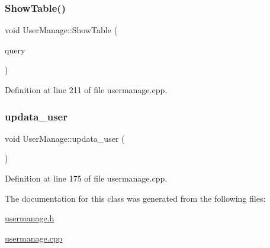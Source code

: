 \mbox{\label{class_user_manage_aa0a2437c0e95fb846c0e5a237d848af2}} 
\subsubsection{\texorpdfstring{ShowTable()}{ShowTable()}}
{\footnotesize\ttfamily void User\+Manage\+::\+Show\+Table (\begin{DoxyParamCaption}\item[{Q\+Sql\+Query}]{query }\end{DoxyParamCaption})}



Definition at line 211 of file usermanage.\+cpp.

\mbox{\label{class_user_manage_ab7f81e5e1f3d9944c551401dba37693f}} 
\subsubsection{\texorpdfstring{updata\_user}{updata\_user}}
{\footnotesize\ttfamily void User\+Manage\+::updata\+\_\+user (\begin{DoxyParamCaption}{ }\end{DoxyParamCaption})\hspace{0.3cm}{\ttfamily [slot]}}



Definition at line 175 of file usermanage.\+cpp.



The documentation for this class was generated from the following files\+:\begin{DoxyCompactItemize}
\item 
\mbox{\hyperlink{usermanage_8h}{usermanage.\+h}}\item 
\mbox{\hyperlink{usermanage_8cpp}{usermanage.\+cpp}}\end{DoxyCompactItemize}
